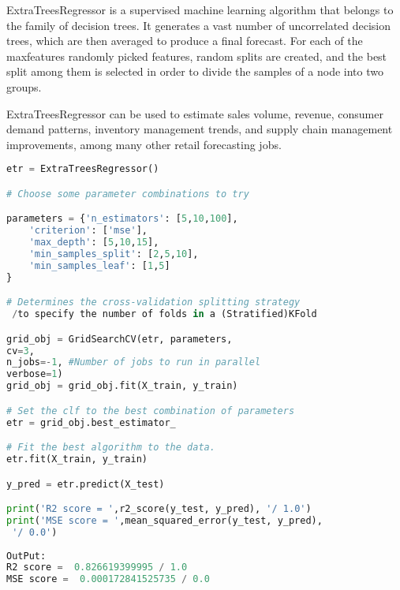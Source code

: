 ExtraTreesRegressor is a supervised machine learning algorithm that belongs to the family of decision trees. It generates a vast number of uncorrelated decision trees, which are then averaged to produce a final forecast. For each of the maxfeatures randomly picked features, random splits are created, and the best split among them is selected in order to divide the samples of a node into two groups.\cite{irshada:2023}  \bigskip

ExtraTreesRegressor can be used to estimate sales volume, revenue, consumer demand patterns, inventory management trends, and supply chain management improvements, among many other retail forecasting jobs.

\begin{lstlisting}[language=Python]
etr = ExtraTreesRegressor()

# Choose some parameter combinations to try

parameters = {'n_estimators': [5,10,100],
	'criterion': ['mse'],
	'max_depth': [5,10,15], 
	'min_samples_split': [2,5,10],
	'min_samples_leaf': [1,5]
}

# Determines the cross-validation splitting strategy 
 /to specify the number of folds in a (Stratified)KFold

grid_obj = GridSearchCV(etr, parameters,
cv=3, 
n_jobs=-1, #Number of jobs to run in parallel
verbose=1)
grid_obj = grid_obj.fit(X_train, y_train)

# Set the clf to the best combination of parameters
etr = grid_obj.best_estimator_

# Fit the best algorithm to the data. 
etr.fit(X_train, y_train)

y_pred = etr.predict(X_test)

print('R2 score = ',r2_score(y_test, y_pred), '/ 1.0')
print('MSE score = ',mean_squared_error(y_test, y_pred),
 '/ 0.0')
	
OutPut:	
R2 score =  0.826619399995 / 1.0
MSE score =  0.000172841525735 / 0.0
\end{lstlisting}


%
%
%
%
%
% 
%
%



